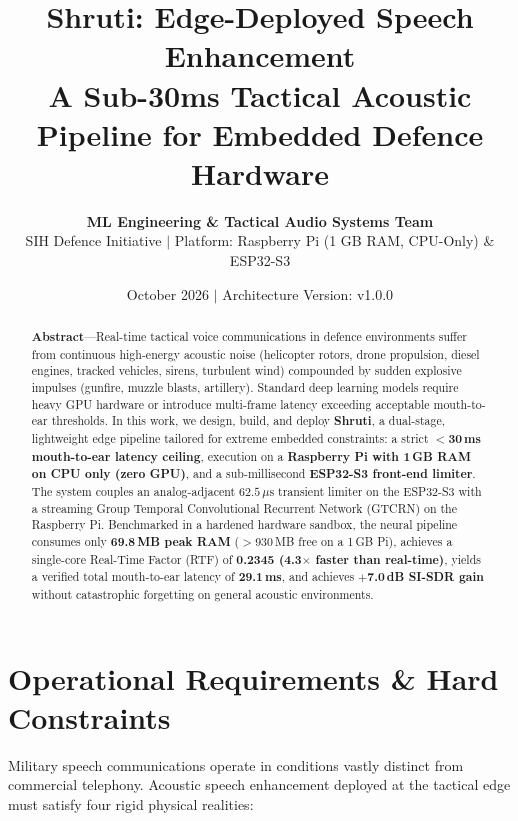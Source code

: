 \documentclass[11pt,a4paper]{article}
\title{\vspace{-1.5cm}
    {\huge\bfseries\color{navyprimary} Shruti: Edge-Deployed Speech Enhancement}\\[6pt]
    {\Large\bfseries\color{tealdark} A Sub-30ms Tactical Acoustic Pipeline for Embedded Defence Hardware}
}
\author{\textbf{ML Engineering \& Tactical Audio Systems Team} \\ \small SIH Defence Initiative \quad $\vert$ \quad Platform: Raspberry Pi (1 GB RAM, CPU-Only) \& ESP32-S3}
\date{\small October 2026 \quad $\vert$ \quad Architecture Version: v1.0.0}
\begin{document}
\maketitle

\begin{abstract}
\noindent\textbf{Abstract}---Real-time tactical voice communications in defence environments suffer from continuous high-energy acoustic noise (helicopter rotors, drone propulsion, diesel engines, tracked vehicles, sirens, turbulent wind) compounded by sudden explosive impulses (gunfire, muzzle blasts, artillery). Standard deep learning models require heavy GPU hardware or introduce multi-frame latency exceeding acceptable mouth-to-ear thresholds. In this work, we design, build, and deploy \textbf{Shruti}, a dual-stage, lightweight edge pipeline tailored for extreme embedded constraints: a strict \textbf{$<$30\,ms mouth-to-ear latency ceiling}, execution on a \textbf{Raspberry Pi with 1\,GB RAM on CPU only (zero GPU)}, and a sub-millisecond \textbf{ESP32-S3 front-end limiter}. The system couples an analog-adjacent $62.5\,\mu\text{s}$ transient limiter on the ESP32-S3 with a streaming Group Temporal Convolutional Recurrent Network (GTCRN) on the Raspberry Pi. Benchmarked in a hardened hardware sandbox, the neural pipeline consumes only \textbf{69.8\,MB peak RAM} ($>$930\,MB free on a 1\,GB Pi), achieves a single-core Real-Time Factor (RTF) of \textbf{0.2345 (4.3$\times$ faster than real-time)}, yields a verified total mouth-to-ear latency of \textbf{29.1\,ms}, and achieves \textbf{$+$7.0\,dB SI-SDR gain} without catastrophic forgetting on general acoustic environments.
\end{abstract}

\vspace{0.4cm}

\section{Operational Requirements \& Hard Constraints}

Military speech communications operate in conditions vastly distinct from commercial telephony. Acoustic speech enhancement deployed at the tactical edge must satisfy four rigid physical realities:
\end{document}
